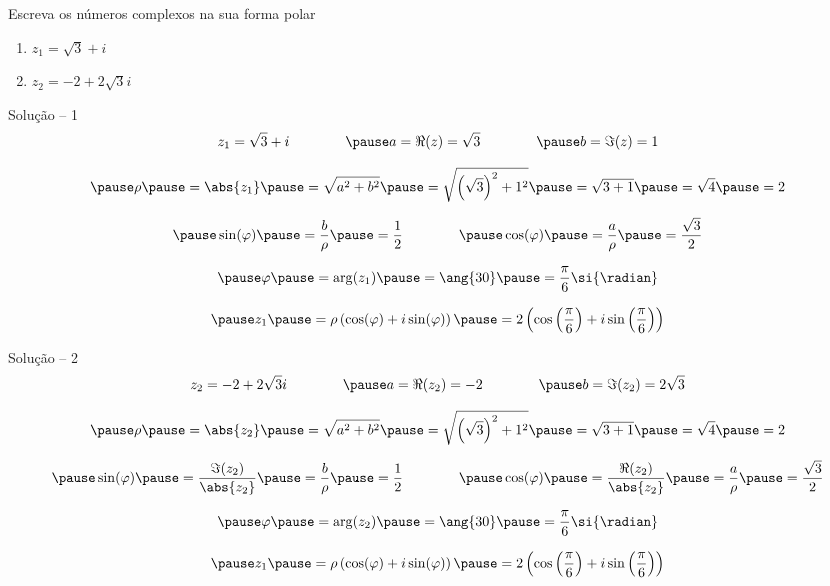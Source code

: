 \begin{question}
  Escreva os números complexos na sua forma polar
  \begin{enumerate}
    \item \(z_1 = \sqrt{3} + i\) \\[3mm]
    \item \(z_2 = -2 + 2\sqrt{3}i\)
  \end{enumerate}
\end{question}

\begin{resolution}{Solução -- 1}
  \[
    z_1 = \sqrt{3} + i
    \qquad\qquad
    \pause a = \Re(z) = \sqrt{3}
    \qquad\qquad
    \pause b = \Im(z) = 1
  \]

  \[
    \pause \rho
    \pause = \abs{z_1}
    \pause = \sqrt{a^2 + b^2}
    \pause = \sqrt{\left(\sqrt{3}\right)^2 + 1^2}
    \pause = \sqrt{3+1}
    \pause = \sqrt{4}
    \pause = 2
  \]

  \[
    \pause \sin(\varphi)
    \pause = \frac{b}{\rho}
    \pause = \frac{1}{2}
    \qquad\qquad
    \pause \cos(\varphi)
    \pause = \frac{a}{\rho}
    \pause = \frac{\sqrt{3}}{2}
  \]

  \[
    \pause \varphi
    \pause = \arg(z_1)
    \pause = \ang{30}
    \pause = \frac{\pi}{6} \si{\radian}
  \]

  \[
    \pause z_1
    \pause = \rho\left(\cos(\varphi)+i\sin(\varphi)\right)
    \pause = 2\left(\cos\left(\frac{\pi}{6}\right)+i\sin\left(\frac{\pi}{6}\right)\right)
  \]
\end{resolution}

\begin{resolution}{Solução -- 2}
  \[
    z_2 = -2 + 2\sqrt{3}i
    \qquad\qquad
    \pause a = \Re(z_2) = -2
    \qquad\qquad
    \pause b = \Im(z_2) = 2\sqrt{3}
  \]

  \[
    \pause \rho
    \pause = \abs{z_2}
    \pause = \sqrt{a^2 + b^2}
    \pause = \sqrt{\left(\sqrt{3}\right)^2 + 1^2}
    \pause = \sqrt{3+1}
    \pause = \sqrt{4}
    \pause = 2
  \]

  \[
    \pause \sin(\varphi)
    \pause = \frac{\Im(z_2)}{\abs{z_2}}
    \pause = \frac{b}{\rho}
    \pause = \frac{1}{2}
    \qquad\qquad
    \pause \cos(\varphi)
    \pause = \frac{\Re(z_2)}{\abs{z_2}}
    \pause = \frac{a}{\rho}
    \pause = \frac{\sqrt{3}}{2}
  \]

  \[
    \pause \varphi
    \pause = \arg(z_2)
    \pause = \ang{30}
    \pause = \frac{\pi}{6} \si{\radian}
  \]

  \[
    \pause z_1
    \pause = \rho\left(\cos(\varphi)+i\sin(\varphi)\right)
    \pause = 2\left(\cos\left(\frac{\pi}{6}\right)+i\sin\left(\frac{\pi}{6}\right)\right)
  \]
\end{resolution}

